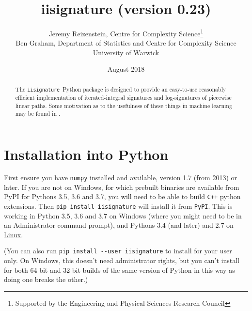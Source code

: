 \documentclass[a4paper]{extarticle}
\begin{document}
\title{iisignature (version 0.23)}
\author{Jeremy Reizenstein, Centre for Complexity Science\thanks{Supported by the Engineering and Physical Sciences Research Council}
\\Ben Graham, Department of Statistics and Centre for Complexity Science
\\University of Warwick}
\date{August 2018}
\maketitle

\def\ii{{\texttt{iisignature}}}
\def\pypi{{\texttt{PyPI}}}
\def\numpy{{\texttt{numpy}}}
\def\scipy{{\texttt{scipy}}}
\def\i#1{\index{#1@\texttt{#1}}}
\def \hilite#1{\underline{\color{blue}\textbf{#1}}}

\begin{abstract}
The \ii\ Python package is designed to provide an easy-to-use reasonably efficient implementation of iterated-integral signatures and log-signatures of piecewise linear paths. Some motivation as to the usefulness of these things in machine learning may be found in \cite{OxSigIntro}.
\end{abstract}

\begin{minipage}{0.6\textwidth}
\tableofcontents
\end{minipage}
\section{Installation into Python}
First ensure you have \verb|numpy| installed and available, version 1.7 (from 2013) or later. If you are not on Windows, for which prebuilt binaries are available from PyPI for Pythons 3.5, 3.6 and 3.7, you will need to be able to build \verb|C++| python extensions. 
Then \verb|pip install iisignature| will install it from \pypi. This is working in Python 3.5, 3.6 and 3.7 on Windows (where you might need to be in an Administrator command prompt), and Pythons 3.4 (and later) and 2.7 on Linux. 

{\small (You can also run \verb|pip install --user iisignature| to install for your user only. On Windows, this doesn't need administrator rights, but you can't install for both 64 bit and 32 bit builds of the same version of Python in this way as doing one breaks the other.)}
\end{document}
